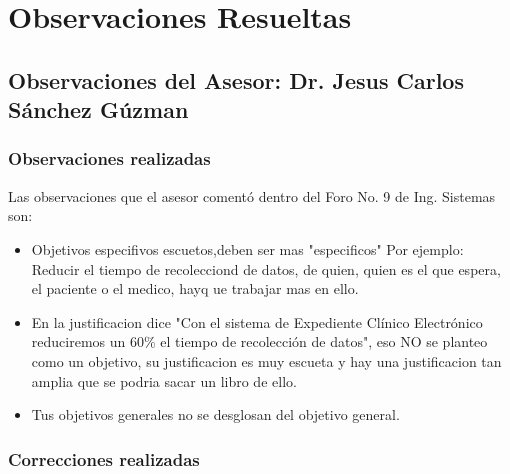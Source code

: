 \chapter{Observaciones Resueltas}


\section{Observaciones del Asesor: Dr. Jesus Carlos Sánchez Gúzman}

    \subsection{Observaciones realizadas}
    Las observaciones que el asesor comentó dentro del Foro No. 9 de Ing. Sistemas son:
    \begin{itemize}
        \item Objetivos especifivos escuetos,deben ser mas "especificos" Por ejemplo: Reducir el tiempo de recolecciond de datos, de quien, quien es el que espera, el paciente o el medico, hayq ue trabajar mas en ello.
        \item En la justificacion dice "Con el sistema de Expediente Clínico Electrónico reduciremos un 60\% el tiempo de recolección de datos", eso NO se planteo como un objetivo, su justificacion es muy escueta y hay una justificacion tan amplia que se podria sacar un libro de ello.
        \item Tus objetivos generales no se desglosan del objetivo general.
    \end{itemize}

    \subsection{Correcciones realizadas}

